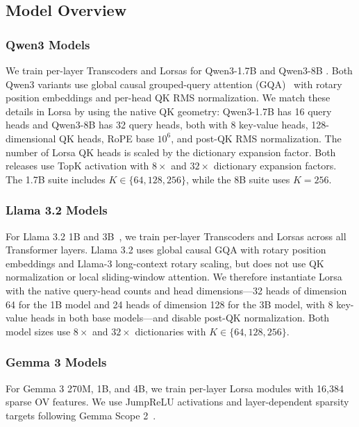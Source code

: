 \documentclass{article}
\begin{document}
\subsection{Model Overview}

\subsubsection{Qwen3 Models}

We train per-layer Transcoders and Lorsas for Qwen3-1.7B and Qwen3-8B
\citep{yang2025qwen3}. Both Qwen3 variants use global causal grouped-query
attention (GQA)~\citep{joshua2023gqa} with rotary position embeddings and
per-head QK RMS normalization. We match these details in Lorsa by using the
native QK geometry: Qwen3-1.7B has 16 query heads and Qwen3-8B has 32 query
heads, both with 8 key-value heads, 128-dimensional QK heads, RoPE base $10^6$,
and post-QK RMS normalization. The number of Lorsa QK heads is scaled by the
dictionary expansion factor. Both releases use TopK activation with $8\times$
and $32\times$ dictionary expansion factors. The 1.7B suite includes
$K\in\{64,128,256\}$, while the 8B suite uses $K=256$.

\subsubsection{Llama 3.2 Models}

For Llama 3.2 1B and 3B~\citep{grattafiori2024llama}, we train per-layer
Transcoders and Lorsas across all Transformer layers. Llama 3.2 uses global
causal GQA with rotary position embeddings and Llama-3 long-context rotary
scaling, but does not use QK normalization or local sliding-window attention. We
therefore instantiate Lorsa with the native query-head counts and head
dimensions---32 heads of dimension 64 for the 1B model and 24 heads of
dimension 128 for the 3B model, with 8 key-value heads in both base models---and
disable post-QK normalization. Both model sizes use $8\times$ and $32\times$
dictionaries with $K\in\{64,128,256\}$.

\subsubsection{Gemma 3 Models}

For Gemma 3 270M, 1B, and 4B, we train per-layer Lorsa modules with 16,384
sparse OV features. We use JumpReLU activations and layer-dependent sparsity
targets following Gemma Scope 2~\citep{mcdougall2025gemmascope2}.
\end{document}
